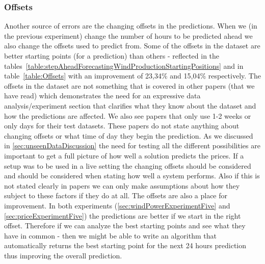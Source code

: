 \subsubsection{Offsets}
\label{sec:offsetsDiscussion}
Another source of errors are the changing offsets in the predictions. When we (in the previous experiment) change the number of hours to be predicted ahead we also change the offsets used to predict from. Some of the offsets in the dataset are better starting points (for a prediction) than others - reflected in the tables~\ref{table:stepAheadForecastingWindProductionStartingPositions} and in table~\ref{table:Offsets} with an improvement of 23,34\% and 15,04\% respectively. The offsets in the dataset are not something that is covered in other papers (that we have read) which demonstrates the need for an expressive data analysis/experiment section that clarifies what they know about the dataset and how the predictions are affected. We also see papers that only use 1-2 weeks\cite{yamin2004adaptive} or only days \cite{1, singhal2011electricity, pjmForecast} for their test datasets. These papers do not state anything about changing offsets or what time of day they begin the prediction. As we discussed in \ref{sec:unseenDataDiscussion} the need for testing all the different possibilities are important to get a full picture of how well a solution predicts the prices. If a setup was to be used in a live setting the changing offsets should be considered and should be considered when stating how well a system performs. Also if this is not stated clearly in papers we can only make assumptions about how they subject to these factors if they do at all. The offsets are also a place for improvement. In both experiments (\ref{sec:windPowerExperimentFive} and \ref{sec:priceExperimentFive}) the predictions are better if we start in the right offset. Therefore if we can analyze the best starting points and see what they have in common - then we might be able to write an algorithm that automatically returns the best starting point for the next 24 hours prediction thus improving the overall prediction.